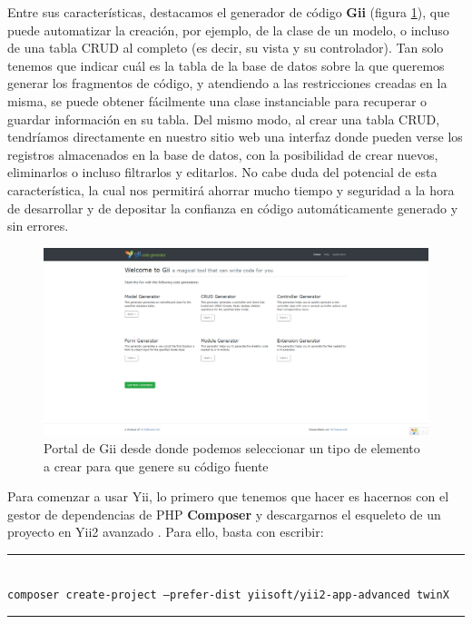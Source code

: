 Entre sus características, destacamos el generador de código \textbf{Gii} (figura \ref{fig:gii}), que puede automatizar la creación, por ejemplo, de la clase de un modelo, o incluso de una tabla CRUD al completo (es decir, su vista y su controlador). Tan solo tenemos que indicar cuál es la tabla de la base de datos sobre la que queremos generar los fragmentos de código, y atendiendo a las restricciones creadas en la misma, se puede obtener fácilmente una clase instanciable para recuperar o guardar información en su tabla. Del mismo modo, al crear una tabla CRUD, tendríamos directamente en nuestro sitio web una interfaz donde pueden verse los registros almacenados en la base de datos, con la posibilidad de crear nuevos, eliminarlos o incluso filtrarlos y editarlos. No cabe duda del potencial de esta característica, la cual nos permitirá ahorrar mucho tiempo y seguridad a la hora de desarrollar y de depositar la confianza en código automáticamente generado y sin errores.

\begin{figure}
	\centering
	\includegraphics[width=\textwidth]{gii}
	\caption[Portal de Gii]{Portal de Gii desde donde podemos seleccionar un tipo de elemento a crear para que genere su código fuente}
	\label{fig:gii}
\end{figure}


Para comenzar a usar Yii, lo primero que tenemos que hacer es hacernos con el gestor de dependencias de PHP \textbf{Composer} \cite{composer} y descargarnos el esqueleto de un proyecto en Yii2 avanzado \cite{yii2advanced}. Para ello, basta con escribir:

\par\noindent\rule{\textwidth}{0.4pt}\linebreak
\\
\texttt{composer create-project --prefer-dist yiisoft/yii2-app-advanced twinX}
\par\noindent\rule{\textwidth}{0.4pt}

